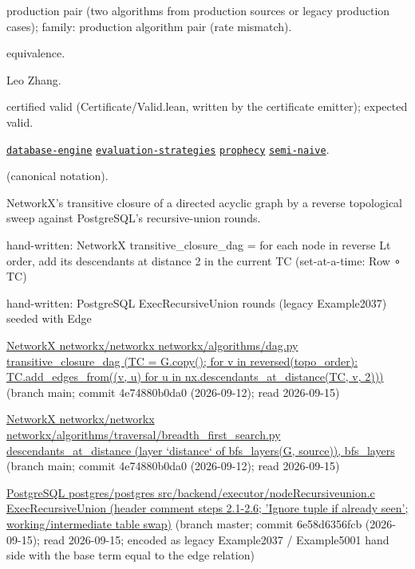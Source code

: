 \documentclass[10pt]{article}
\begin{document}
\begin{description}[leftmargin=2.6cm,style=nextline,itemsep=1pt]

\item[Category] production pair (two algorithms from production sources or legacy production cases); family: production algorithm pair (rate mismatch).

\item[Kind] equivalence.

\item[Contributors] Leo Zhang.

\item[Status] certified valid (Certificate/Valid.lean, written by the certificate emitter); expected valid.

\item[Tags] \hyperref[tag:database-engine]{\texttt{database-engine}} \hyperref[tag:evaluation-strategies]{\texttt{evaluation-strategies}} \hyperref[tag:prophecy]{\texttt{prophecy}} \hyperref[tag:semi-naive]{\texttt{semi-naive}}.

\item[Input]  (canonical notation).

\item[Summary] NetworkX's transitive closure of a directed acyclic graph by a reverse topological sweep against PostgreSQL's recursive-union rounds.

\item[Sides] hand-written: NetworkX transitive\_closure\_dag = for each node in reverse Lt order, add its descendants at distance 2 in the current TC (set-at-a-time: Row ∘ TC) \par hand-written: PostgreSQL ExecRecursiveUnion rounds (legacy Example2037) seeded with Edge

\item[Sources] {\raggedright \href{https://github.com/networkx/networkx/blob/main/networkx/algorithms/dag.py}{NetworkX networkx/networkx networkx/algorithms/dag.py transitive\_closure\_dag (TC = G.copy(); for v in reversed(topo\_order): TC.add\_edges\_from((v, u) for u in nx.descendants\_at\_distance(TC, v, 2)))} (branch main; commit 4e74880b0da0 (2026-09-12); read 2026-09-15) \par \href{https://github.com/networkx/networkx/blob/main/networkx/algorithms/traversal/breadth_first_search.py}{NetworkX networkx/networkx networkx/algorithms/traversal/breadth\_first\_search.py descendants\_at\_distance (layer `distance` of bfs\_layers(G, source)), bfs\_layers} (branch main; commit 4e74880b0da0 (2026-09-12); read 2026-09-15) \par \href{https://github.com/postgres/postgres/blob/master/src/backend/executor/nodeRecursiveunion.c}{PostgreSQL postgres/postgres src/backend/executor/nodeRecursiveunion.c ExecRecursiveUnion (header comment steps 2.1-2.6; 'Ignore tuple if already seen'; working/intermediate table swap)} (branch master; commit 6e58d6356fcb (2026-09-15); read 2026-09-15; encoded as legacy Example2037 / Example5001 hand side with the base term equal to the edge relation)\par}


\end{description}
\end{document}
